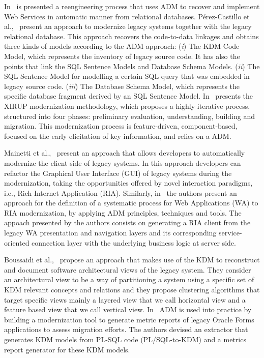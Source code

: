  In~\cite{delCastillo:2009:PRP:1529282.1529753, ICEISPerez:CastilloGCP12} is presented a reengineering process that uses ADM to recover and implement Web Services in automatic manner from relational databases. P\'{e}rez-Castillo et al.,~\cite{5328801} present an approach to modernize legacy systems together with the legacy relational database. This approach recovers the code-to-data linkages and obtains three kinds of models according to the ADM approach: (\textit{i}) The KDM Code Model, which represents the inventory of legacy source code. It has also the points that link the SQL Sentence Models and Database Schema Models. (\textit{ii}) The SQL Sentence Model for modelling a certain SQL query that was embedded in legacy source code. (\textit{iii}) The Database Schema Model, which represents the specific database fragment derived by an SQL Sentence Model. In~\cite{FuentesFernandez2012247} presents the XIRUP modernization methodology, which proposes a highly iterative process, structured into four phases: preliminary evaluation, understanding, building and migration. This modernization process is feature-driven, component-based, focused on the early elicitation of key information, and relies on a ADM.

Mainetti et al.,~\cite{Mainetti:2012:MMT:2364120.2364182} present an approach that allows developers to automatically modernize the client side of legacy systems. In this approach developers can refactor the Graphical User Interface (GUI) of legacy systems during the modernization, taking the opportunities offered by novel interaction paradigms, i.e., Rich Internet Application (RIA). Similarly, in~\cite{Rodriguez-Echeverria:2011:MLW:2186508.2186536} the authors present an approach for the definition of a systematic process for Web Applications (WA) to RIA modernization, by applying ADM principles, techniques and tools. The appoach presented by the authors consists on generating a RIA client from the legacy WA presentation and navigation layers and its corresponding service-oriented connection layer with the underlying business logic at server side.

Boussaidi et al.,~\cite{6385130} propose an approach that makes use of the KDM to reconstruct and document software architectural views of the legacy system. They consider an architectural view to be a way of partitioning a system using a specific set of KDM relevant concepts and relations and they propose clustering algorithms that target specific views mainly a layered view that we call horizontal view and a feature based view that we call vertical view. In~\cite{5440163} ADM is used into practice by building a modernization tool to generate metric reports of legacy Oracle Forms applications to assess migration efforts. The authors devised an extractor that generates KDM models from PL-SQL code (PL/SQL-to-KDM) and a metrics report generator for these KDM models. 

